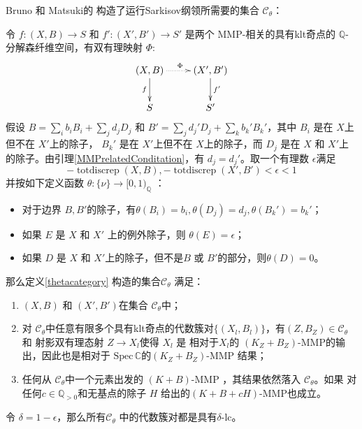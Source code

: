  Bruno 和 Matsuki的\cite[Lemma 3.6]{brunoLogSarkisovProgram1995} 构造了运行Sarkisov纲领所需要的集合 $\mathcal{C}_{\theta} $：
\begin{proposition}\label{cat}
  令 $ f:(X,B)\to S$ 和 $f':(X',B')\to S' $ 是两个 MMP-相关的具有klt奇点的 $ \mathbb{Q} $-分解森纤维空间，有双有理映射 $\Phi$:
  \[ \xymatrix{
      {(X,B)}\ar[d]_{f}\ar@{.>}[r]^\Phi&(X',B')\ar[d]^{f'}\\
      S&S'} \]
假设 $ B=\sum_{i}b_{i}B_{i}+\sum_{j}d_{j}D_j $ 和 $ B'=\sum_jd_j'D_j+\sum_kb_k'B_k' $，其中 $ B_{i} $ 是在 $ X $上但不在 $ X' $上的除子， $ B_k' $ 是在 $ X' $上但不在  $ X $上的除子，而 $ D_j $ 是在 $ X $ 和 $ X' $上的除子。由引理\ref{MMPrelatedConditation}，有 $ d_j=d_j' $。取一个有理数 $\epsilon$满足 
\[
  -\operatorname{totdiscrep}(X,B),-\operatorname{totdiscrep}(X',B')  <\epsilon <1 
\]
并按如下定义函数 $ \theta: \{ \nu \} \to [0,1)_{\mathbb{Q}} $ ：
  \begin{itemize}
    \item 对于边界  $B,B'$的除子，有$ \theta(B_i)=b_i, \theta(D_j)=d_j,\theta(B_k')=b_k'$；
    \item  如果 $E$ 是 $X$ 和 $X'$ 上的例外除子，则    $ \theta(E)=\epsilon $；
    \item   如果 $ D $ 是 $ X $ 和 $ X' $上的除子，但不是$ B $ 或 $ B' $的部分，则$ \theta(D)=0 $。
  \end{itemize}
  那么定义\ref{thetacategory} 构造的集合$ \mathcal{C}_{\theta} $ 满足：
  \begin{enumerate}
    \item $ (X,B) $ 和 $ (X',B') $在集合 $ \mathcal{C}_{\theta} $中；
    \item   对 $ \mathcal{C}_{\theta} $中任意有限多个具有klt奇点的代数簇对$ \{(X_l,B_l)\} $，有$ (Z,B_Z)\in \mathcal{C}_{\theta} $ 和 射影双有理态射 $ Z\to X_l $使得 $X_{l}$ 是 相对于$X_{l}$的   $ (K_{Z}+B_{Z}) $-MMP的输出，因此也是相对于 $ \mathrm{Spec}\,\mathbb{C} $的$(K_Z+B_Z)$-MMP 结果；
    \item 任何从  $ \mathcal{C}_{\theta} $中一个元素出发的 $ (K+B) $-MMP ，其结果依然落入 $ \mathcal{C}_{\theta} $。如果 对任何$ c\in \mathbb{Q}_{>0} $和无基点的除子 $H$ 给出的$ (K+B+cH) $-MMP也成立。
  \end{enumerate}
\end{proposition}
\begin{remark}\label{delta-lc}
  令 $\delta=1-\epsilon$，那么所有$\mathcal{C}_{\theta}$ 中的代数簇对都是具有$\delta$-lc。
\end{remark}

